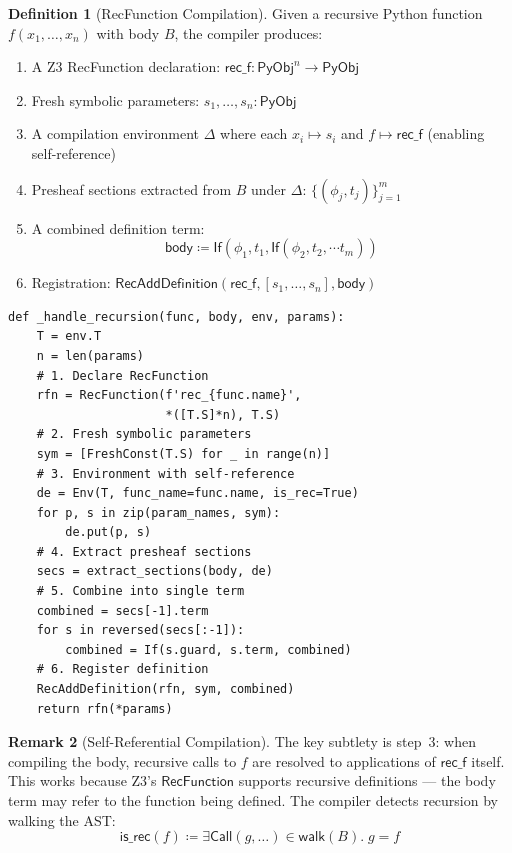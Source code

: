 \documentclass[11pt,a4paper]{report}
\theoremstyle{definition}
\newtheorem{definition}{Definition}[chapter]
\newtheorem{remark}[definition]{Remark}
\theoremstyle{plain}
\newcommand{\PyObj}{\mathsf{PyObj}}
\begin{document}
\begin{definition}[RecFunction Compilation]
\label{def:recfn-compile}
Given a recursive Python function $f(x_1, \ldots, x_n)$ with body
$B$, the compiler produces:
\begin{enumerate}
  \item A Z3 RecFunction declaration:
    $\mathsf{rec\_f} : \PyObj^n \to \PyObj$
  \item Fresh symbolic parameters:
    $s_1, \ldots, s_n : \PyObj$
  \item A compilation environment $\Delta$ where each $x_i \mapsto s_i$
    and $f \mapsto \mathsf{rec\_f}$ (enabling self-reference)
  \item Presheaf sections extracted from $B$ under $\Delta$:
    $\{(\phi_j, t_j)\}_{j=1}^{m}$
  \item A combined definition term:
    \[
      \mathsf{body} \coloneqq
        \mathsf{If}(\phi_1, t_1,
          \mathsf{If}(\phi_2, t_2,
            \cdots t_m))
    \]
  \item Registration:
    $\mathsf{RecAddDefinition}(\mathsf{rec\_f},
      [s_1, \ldots, s_n], \mathsf{body})$
\end{enumerate}
\end{definition}

\begin{lstlisting}[caption={RecFunction compilation: implementation}]
def _handle_recursion(func, body, env, params):
    T = env.T
    n = len(params)
    # 1. Declare RecFunction
    rfn = RecFunction(f'rec_{func.name}',
                      *([T.S]*n), T.S)
    # 2. Fresh symbolic parameters
    sym = [FreshConst(T.S) for _ in range(n)]
    # 3. Environment with self-reference
    de = Env(T, func_name=func.name, is_rec=True)
    for p, s in zip(param_names, sym):
        de.put(p, s)
    # 4. Extract presheaf sections
    secs = extract_sections(body, de)
    # 5. Combine into single term
    combined = secs[-1].term
    for s in reversed(secs[:-1]):
        combined = If(s.guard, s.term, combined)
    # 6. Register definition
    RecAddDefinition(rfn, sym, combined)
    return rfn(*params)
\end{lstlisting}

\begin{remark}[Self-Referential Compilation]
The key subtlety is step~3: when compiling the body, recursive
calls to $f$ are resolved to applications of $\mathsf{rec\_f}$
itself.  This works because Z3's $\mathsf{RecFunction}$ supports
recursive definitions --- the body term may refer to the function
being defined.  The compiler detects recursion by walking the AST:
\[
  \mathsf{is\_rec}(f) \coloneqq
    \exists \mathsf{Call}(g, \ldots) \in \mathsf{walk}(B).\;
    g = f
\]
\end{remark}
\end{document}
